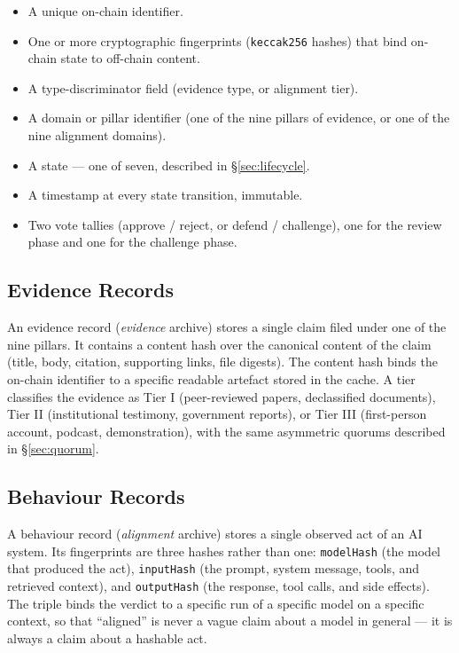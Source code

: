\documentclass[11pt,a4paper]{article}
\begin{document}
\begin{itemize}[leftmargin=1.5em]
  \item A unique on-chain identifier.
  \item One or more cryptographic fingerprints (\texttt{keccak256}
        hashes) that bind on-chain state to off-chain content.
  \item A type-discriminator field (evidence type, or alignment
        tier).
  \item A domain or pillar identifier (one of the nine pillars
        of evidence, or one of the nine alignment domains).
  \item A state --- one of seven, described in
        \S\ref{sec:lifecycle}.
  \item A timestamp at every state transition, immutable.
  \item Two vote tallies (approve / reject, or defend /
        challenge), one for the review phase and one for the
        challenge phase.
\end{itemize}

\subsection{Evidence Records}

An evidence record (\emph{evidence} archive) stores a single
claim filed under one of the nine pillars. It contains a
content hash over the canonical content of the claim
(title, body, citation, supporting links, file digests). The
content hash binds the on-chain identifier to a specific
readable artefact stored in the cache. A tier classifies the
evidence as Tier I (peer-reviewed papers, declassified
documents), Tier II (institutional testimony, government
reports), or Tier III (first-person account, podcast,
demonstration), with the same asymmetric quorums described in
\S\ref{sec:quorum}.

\subsection{Behaviour Records}

A behaviour record (\emph{alignment} archive) stores a single
observed act of an AI system. Its fingerprints are three
hashes rather than one: \texttt{modelHash} (the model that
produced the act), \texttt{inputHash} (the prompt, system
message, tools, and retrieved context), and \texttt{outputHash}
(the response, tool calls, and side effects). The triple binds
the verdict to a specific run of a specific model on a specific
context, so that ``aligned'' is never a vague claim about a
model in general --- it is always a claim about a hashable act.
\end{document}
